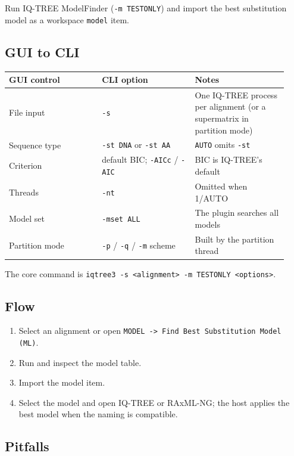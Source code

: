 \documentclass[11pt]{report}
\begin{document}
Run IQ-TREE ModelFinder (\texttt{-m TESTONLY}) and import the best substitution model as a workspace \texttt{model} item.

\subsection{GUI to CLI}

{\footnotesize
\begin{longtable}{@{}>{\raggedright\arraybackslash}p{0.31\linewidth}>{\raggedright\arraybackslash}p{0.31\linewidth}>{\raggedright\arraybackslash}p{0.31\linewidth}@{}}
\toprule
GUI control & CLI option & Notes \\
\midrule
\endhead
File input & \texttt{-s} & One IQ-TREE process per alignment (or a supermatrix in partition mode) \\
Sequence type & \texttt{-st DNA} or \texttt{-st AA} & \texttt{AUTO} omits \texttt{-st} \\
Criterion & default BIC; \texttt{-AICc} / \texttt{-AIC} & BIC is IQ-TREE's default \\
Threads & \texttt{-nt} & Omitted when 1/AUTO \\
Model set & \texttt{-mset ALL} & The plugin searches all models \\
Partition mode & \texttt{-p} / \texttt{-q} / \texttt{-m} scheme & Built by the partition thread \\
\bottomrule
\end{longtable}
}

The core command is \texttt{iqtree3 -s <alignment> -m TESTONLY <options>}.

\subsection{Flow}

\begin{enumerate}
  \item Select an alignment or open \texttt{MODEL -> Find Best Substitution Model \allowbreak (ML)}.
  \item Run and inspect the model table.
  \item Import the model item.
  \item Select the model and open IQ-TREE or RAxML-NG; the host applies the best model when the naming is compatible.
\end{enumerate}

\subsection{Pitfalls}
\end{document}
